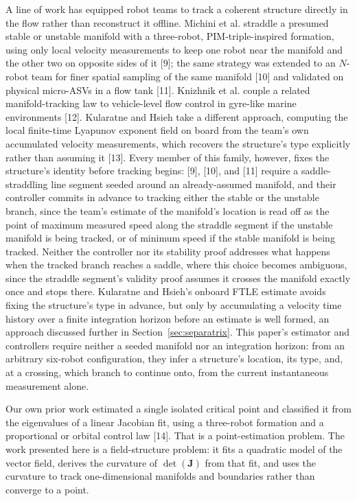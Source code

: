 \documentclass[lettersize,journal]{IEEEtran}
\begin{document}
A line of work has equipped robot teams to track a coherent structure directly
in the flow rather than reconstruct it offline. Michini et al. straddle a
presumed stable or unstable manifold with a three-robot, PIM-triple-inspired
formation, using only local velocity measurements to keep one robot near the
manifold and the other two on opposite sides of it [9]; the same strategy was
extended to an $N$-robot team for finer spatial sampling of the same manifold
[10] and validated on physical micro-ASVs in a flow tank [11]. Knizhnik et al.
couple a related manifold-tracking law to vehicle-level flow control in
gyre-like marine environments [12]. Kularatne and Hsieh take a different
approach, computing the local finite-time Lyapunov exponent field on board
from the team's own accumulated velocity measurements, which recovers the
structure's type explicitly rather than assuming it [13]. Every member of this
family, however, fixes the structure's identity before tracking begins: [9],
[10], and [11] require a saddle-straddling line segment seeded around an
already-assumed manifold, and their controller commits in advance to
tracking either the stable or the unstable branch, since the team's estimate
of the manifold's location is read off as the point of maximum measured speed
along the straddle segment if the unstable manifold is being tracked, or of
minimum speed if the stable manifold is being tracked. Neither the controller
nor its stability proof addresses what happens when the tracked branch
reaches a saddle, where this choice becomes ambiguous, since the straddle
segment's validity proof assumes it crosses the manifold exactly once and
stops there. Kularatne and Hsieh's onboard FTLE estimate avoids fixing the
structure's type in advance, but only by accumulating a velocity time history
over a finite integration horizon before an estimate is well formed, an
approach discussed further in Section~\ref{sec:separatrix}. This paper's
estimator and controllers require neither a seeded manifold nor an
integration horizon: from an arbitrary six-robot configuration, they infer a
structure's location, its type, and, at a crossing, which branch to continue
onto, from the current instantaneous measurement alone.

Our own prior work estimated a single isolated critical point and classified
it from the eigenvalues of a linear Jacobian fit, using a three-robot
formation and a proportional or orbital control law [14]. That is a
point-estimation problem. The work presented here is a field-structure
problem: it fits a quadratic model of the vector field, derives the
curvature of $\det(\mathbf{J})$ from that fit, and uses the curvature to
track one-dimensional manifolds and boundaries rather than converge to a
point.
\end{document}
